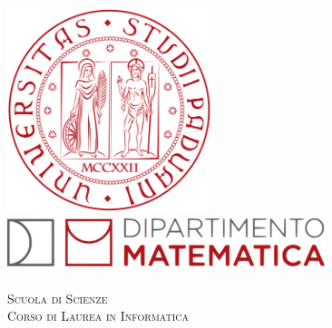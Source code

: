 \begin{titlepage}
    
    \newcommand{\HRule}{\rule{\linewidth}{0.5mm}} 
    
    \center
    
    
    
    \begin{LARGE}
        \textsc{\textbf{\myUni}}\\[1cm] 
    \end{LARGE}
    
    
    \includegraphics[height=6cm]{immagini/logo-unipd.png}\\[1cm]
    
    \includegraphics[height=1.5cm, width = 9.25cm]{immagini/MathDip.png}\\
    \textsc{\myDepartment}\\[1cm]
    
    \textsc{\Large Scuola di Scienze}\\[0.5cm] 
    
    \textsc{\large Corso di Laurea in Informatica}\\[0.5cm] 
    

\end{titlepage}
